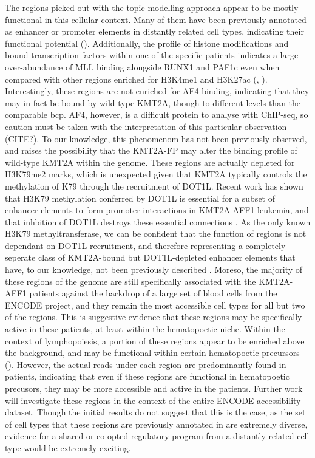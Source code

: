 The regions picked out with the topic modelling approach appear to be mostly functional in this cellular context. Many of them have been previously annotated as enhancer or promoter elements in distantly related cell types, indicating their functional potential (). Additionally, the profile of histone modifications and bound transcription factors within one of the specific patients indicates a large over-abundance of MLL binding alongside RUNX1 and PAF1c even when compared with other regions enriched for H3K4me1 and H3K27ac (, ). Interestingly, these regions are not enriched for AF4 binding, indicating that they may in fact be bound by wild-type KMT2A, though to different levels than the comparable \gls{bcp}. AF4, however, is a difficult protein to analyse with ChIP-seq, so caution must be taken with the interpretation of this particular observation (CITE?). To our knowledge, this phenomenom has not been previously observed, and raises the possibility that the KMT2A-FP may alter the binding profile of wild-type KMT2A within the genome. These regions are actually depleted for H3K79me2 marks, which is unexpected given that KMT2A typically controls the methylation of K79 through the recruitment of DOT1L. Recent work has shown that H3K79 methylation conferred by DOT1L is essential for a subset of enhancer elements to form promoter interactions in KMT2A-AFF1 leukemia, and that inhbition of DOT1L destroys these essential connections \cite{Godfrey2019}. As the only known H3K79 methyltransferase, we can be confident that the function of regions is not dependant on DOT1L recruitment, and therefore representing a completely seperate class of KMT2A-bound but DOT1L-depleted enhancer elements that have, to our knowledge, not been previously described \cite{Q2002}. Moreso, the majority of these regions of the genome are still specifically associated with the KMT2A-AFF1 patients against the backdrop of a large set of blood cells from the ENCODE project, and they remain the most accessible cell types for all but two of the regions. This is suggestive evidence that these regions may be specifically active in these patients, at least within the hematopoetic niche. Within the context of lymphopoiesis, a portion of these regions appear to be enriched above the background, and may be functional within certain hematopoetic precursors (). However, the actual reads under each region are predominantly found in patients, indicating that even if these regions are functional in hematopoetic precusors, they may be more accessible and active in the patients. Further work will investigate these regions in the context of the entire ENCODE accessibility dataset. Though the initial results do not suggest that this is the case, as the set of cell types that these regions are previously annotated in are extremely diverse, evidence for a shared or co-opted regulatory program from a distantly related cell type would be extremely exciting. 

